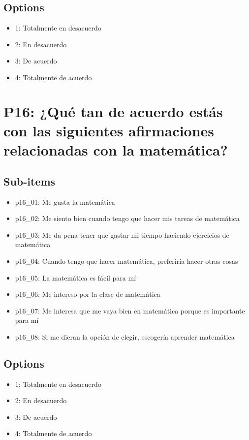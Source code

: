 \documentclass[11pt]{article}
\begin{document}
\subsection*{Options}
\begin{itemize}[leftmargin=*]
  \item 1: Totalmente en desacuerdo
  \item 2: En desacuerdo
  \item 3: De acuerdo
  \item 4: Totalmente de acuerdo
\end{itemize}
\bigskip
\section*{P16: ¿Qué tan de acuerdo estás con las siguientes afirmaciones relacionadas con la matemática?}
\subsection*{Sub-items}
\begin{itemize}[leftmargin=*]
  \item p16\_01: Me gusta la matemática
  \item p16\_02: Me siento bien cuando tengo que hacer mis tareas de matemática
  \item p16\_03: Me da pena tener que gastar mi tiempo haciendo ejercicios de matemática
  \item p16\_04: Cuando tengo que hacer matemática, preferiría hacer otras cosas
  \item p16\_05: La matemática es fácil para mí
  \item p16\_06: Me intereso por la clase de matemática
  \item p16\_07: Me interesa que me vaya bien en matemática porque es importante para mí
  \item p16\_08: Si me dieran la opción de elegir, escogería aprender matemática
\end{itemize}
\subsection*{Options}
\begin{itemize}[leftmargin=*]
  \item 1: Totalmente en desacuerdo
  \item 2: En desacuerdo
  \item 3: De acuerdo
  \item 4: Totalmente de acuerdo
\end{itemize}
\bigskip
\end{document}
